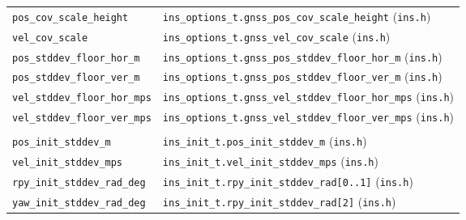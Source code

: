 \documentclass[11pt,a4paper]{article}
\newcommand{\code}[1]{\texttt{#1}}
\begin{document}
\begin{landscape}
\begin{center}
\begin{longtable}{@{}p{6.5cm}p{16.5cm}@{}}
\code{pos\_\allowbreak{}cov\_\allowbreak{}scale\_\allowbreak{}height} & \code{ins\_\allowbreak{}options\_\allowbreak{}t.gnss\_\allowbreak{}pos\_\allowbreak{}cov\_\allowbreak{}scale\_\allowbreak{}height} (\code{ins.h}) \\
\code{vel\_\allowbreak{}cov\_\allowbreak{}scale}      & \code{ins\_\allowbreak{}options\_\allowbreak{}t.gnss\_\allowbreak{}vel\_\allowbreak{}cov\_\allowbreak{}scale} (\code{ins.h}) \\
\code{pos\_\allowbreak{}stddev\_\allowbreak{}floor\_\allowbreak{}hor\_\allowbreak{}m} & \code{ins\_\allowbreak{}options\_\allowbreak{}t.gnss\_\allowbreak{}pos\_\allowbreak{}stddev\_\allowbreak{}floor\_\allowbreak{}hor\_\allowbreak{}m} (\code{ins.h}) \\
\code{pos\_\allowbreak{}stddev\_\allowbreak{}floor\_\allowbreak{}ver\_\allowbreak{}m} & \code{ins\_\allowbreak{}options\_\allowbreak{}t.gnss\_\allowbreak{}pos\_\allowbreak{}stddev\_\allowbreak{}floor\_\allowbreak{}ver\_\allowbreak{}m} (\code{ins.h}) \\
\code{vel\_\allowbreak{}stddev\_\allowbreak{}floor\_\allowbreak{}hor\_\allowbreak{}mps} & \code{ins\_\allowbreak{}options\_\allowbreak{}t.gnss\_\allowbreak{}vel\_\allowbreak{}stddev\_\allowbreak{}floor\_\allowbreak{}hor\_\allowbreak{}mps} (\code{ins.h}) \\
\code{vel\_\allowbreak{}stddev\_\allowbreak{}floor\_\allowbreak{}ver\_\allowbreak{}mps} & \code{ins\_\allowbreak{}options\_\allowbreak{}t.gnss\_\allowbreak{}vel\_\allowbreak{}stddev\_\allowbreak{}floor\_\allowbreak{}ver\_\allowbreak{}mps} (\code{ins.h}) \\
\addlinespace
\multicolumn{2}{l}{\textbf{\code{init\_\allowbreak{}stddev:}, initial-state 1-sigma}} \\
\code{pos\_\allowbreak{}init\_\allowbreak{}stddev\_\allowbreak{}m} & \code{ins\_\allowbreak{}init\_\allowbreak{}t.pos\_\allowbreak{}init\_\allowbreak{}stddev\_\allowbreak{}m} (\code{ins.h}) \\
\code{vel\_\allowbreak{}init\_\allowbreak{}stddev\_\allowbreak{}mps} & \code{ins\_\allowbreak{}init\_\allowbreak{}t.vel\_\allowbreak{}init\_\allowbreak{}stddev\_\allowbreak{}mps} (\code{ins.h}) \\
\code{rpy\_\allowbreak{}init\_\allowbreak{}stddev\_\allowbreak{}rad\_\allowbreak{}deg} & \code{ins\_\allowbreak{}init\_\allowbreak{}t.rpy\_\allowbreak{}init\_\allowbreak{}stddev\_\allowbreak{}rad[0..1]} (\code{ins.h}) \\
\code{yaw\_\allowbreak{}init\_\allowbreak{}stddev\_\allowbreak{}rad\_\allowbreak{}deg} & \code{ins\_\allowbreak{}init\_\allowbreak{}t.rpy\_\allowbreak{}init\_\allowbreak{}stddev\_\allowbreak{}rad[2]} (\code{ins.h}) \\

\end{longtable}
\end{center}
\end{landscape}
\end{document}
